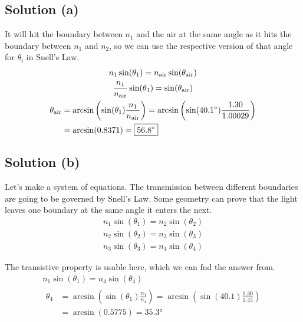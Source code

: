 \documentclass[12pt]{article}
\begin{document}
        \subsection{Solution (a)}
            It will hit the boundary between $n_1$ and the air at the same angle as it hits the boundary between $n_1$ and $n_2$, so we can use the respective version of that angle for $\theta_i$ in Snell's Law.
            \begin{gather}
                n_1 \sin(\theta_1) = n_{\rm air} \sin(\theta_{\rm air})\\
                \frac{n_1}{n_{\rm air}} \sin(\theta_1) = \sin(\theta_{\rm air})\\
                \begin{align}
                    \theta_{\rm air}    &=  \arcsin \left( \sin(\theta_1) \frac{n_1}{n_{\rm air}} \right)
                        =   \arcsin \left( \sin(40.1\unit{\degree}) \frac{1.30}{1.00029} \right)\\
                        &=  \arcsin(0.8371)
                        =   \boxed{56.8\unit{\degree}}
                \end{align}
            \end{gather}

        \subsection{Solution (b)}
            Let's make a system of equations.
            The transmission between different boundaries are going to be governed by Snell's Law.
            Some geometry can prove that the light leaves one boundary at the same angle it enters the next.
            \begin{gather}
                n_1 \sin(\theta_1) = n_2 \sin(\theta_2)\\
                n_2 \sin(\theta_2) = n_3 \sin(\theta_3)\\
                n_3 \sin(\theta_3) = n_4 \sin(\theta_4)
            \end{gather}

            The transistive property is usable here, which we can fnd the answer from.
            \begin{gather}
                n_1 \sin(\theta_1) = n_4 \sin(\theta_4)\\
                \begin{align}
                    \theta_4    &=  \arcsin \left( \sin(\theta_1) \frac{n_1}{n_4} \right)
                        =   \arcsin \left( \sin(40.1) \frac{1.30}{1.45} \right)\\
                        &=  \arcsin (0.5775)
                        =   \boxed{35.3\unit{\degree}}
                \end{align}
            \end{gather}
\end{document}
